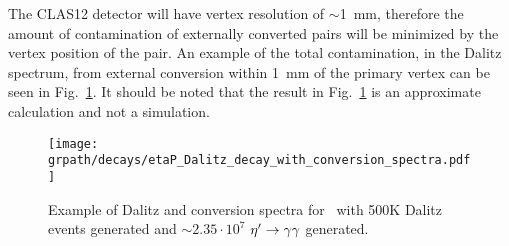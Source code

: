\FloatBarrier
 The CLAS12 detector will have vertex resolution of $\sim$1~mm, therefore the amount of contamination of externally converted pairs will be minimized by the vertex position of the \epemT pair. An example of the total contamination, in the Dalitz spectrum, from external conversion within 1~mm of the primary vertex can be seen in Fig.~\ref{fig:dalitz_w_conversion}. It should be noted that the result in Fig.~\ref{fig:dalitz_w_conversion} is an approximate calculation and not a simulation.
 \begin{figure}[h!]\begin{center}
 			\texttt{[image: \\grpath/decays/etaP\_Dalitz\_decay\_with\_conversion\_spectra.pdf]}
\caption[Dalitz and conversion spectra for \etaTP \ and $\phi$]{\label{fig:dalitz_w_conversion}Example of Dalitz and conversion spectra for \etaTP \ with 500K Dalitz events generated and $\sim 2.35 \cdot 10^7$ $\eta^{\prime} \to \gamma \gamma$ generated.}
\end{center}\end{figure}
\FloatBarrier
  
  
  